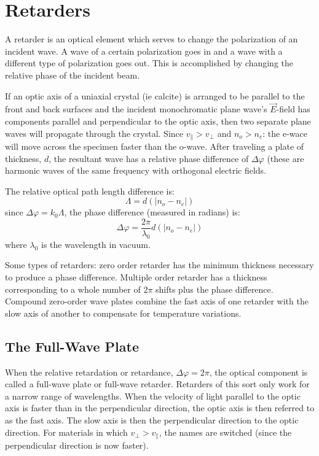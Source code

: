 \documentclass[12pt]{report}
\begin{document}
\section{Retarders}
A retarder is an optical element which serves to change the polarization of an incident wave. A wave of a certain polarization goes in and a wave with a different type of polarization goes out. This is accomplished by changing the relative phase of the incident beam. 

If an optic axis of a uniaxial crystal (ie calcite) is arranged to be parallel to the front and back surfaces and the incident monochromatic plane wave's $\vec{E}$-field has components parallel and perpendicular to the optic axis, then two separate plane waves will propagate through the crystal. Since $v_\parallel>v_\perp$ and $n_o>n_e$: the e-wace will move across the specimen faster than the o-wave. After traveling a plate of thickness, $d$, the resultant wave has a relative phase difference of $\Delta\varphi$ (these are harmonic waves of the same frequency with orthogonal electric fields. 

The relative optical path length difference is:
\[\Lambda = d(|n_o-n_e|)\]
since $\Delta\varphi = k_0\Lambda$, the phase difference (measured in radians) is:
\begin{equation}
\Delta\varphi=\frac{2\pi}{\lambda_0}d(|n_o-n_e|)
\end{equation}
where $\lambda_0$ is the wavelength in vacuum. 

Some types of retarders: zero order retarder has the minimum thickness necessary to produce a phase difference. Multiple order retarder has a thickness corresponding to a whole number of $2\pi$ shifts plus the phase difference. Compound zero-order wave plates combine the fast axis of one retarder with the slow axis of another to compensate for temperature variations. 

\subsection{The Full-Wave Plate}
When the relative retardation or retardance, $\Delta\varphi = 2\pi$, the optical component is called a full-wave plate or full-wave retarder. Retarders of this sort only work for a narrow range of wavelengths. When the velocity of light parallel to the optic axis is faster than in the perpendicular direction, the optic axis is then referred to as the fast axis. The slow axis is then the perpendicular direction to the optic direction. For materials in which $v_\perp > v_\parallel$, the names are switched (since the perpendicular direction is now faster). 
\end{document}
